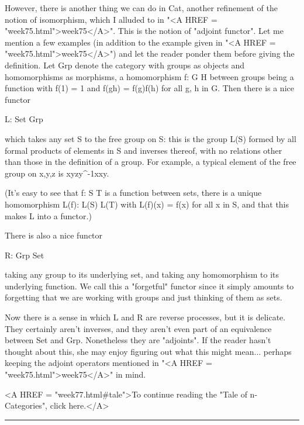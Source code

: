 However, there is another thing we can do in Cat, another refinement of
the notion of isomorphism, which I alluded to in "<A HREF =
"week75.html">week75</A>".  This is the notion of "adjoint
functor".  Let me mention a few examples (in addition to the
example given in "<A HREF = "week75.html">week75</A>") and let
the reader ponder them before giving the definition.  Let Grp denote the
category with groups as objects and homomorphisms as morphisms, a
homomorphism f: G \to  H between groups being a function with f(1) = 1
and f(gh) = f(g)f(h) for all g, h in G.  Then there is a nice functor

                        L: Set \to  Grp

which takes any set S to the free group on S: this is the group L(S) formed
by all formal products of elements in S and inverses thereof, with no
relations other than those in the definition of a group.  For
example, a typical element of the free group on {x,y,z} is
xyzy^{-1}xxy.  

(It's easy to see that f: S \to  T is a function between sets, there is a
unique homomorphism L(f): L(S) \to  L(T) with L(f)(x) = f(x) for all x in
S, and that this makes L into a functor.)

There is also a nice functor

                        R: Grp \to  Set

taking any group to its underlying set, and taking any homomorphism to
its underlying function.  We call this a "forgetful" functor since it
simply amounts to forgetting that we are working with groups and just
thinking of them as sets.  

Now there is a sense in which L and R are reverse processes, but it is
delicate.  They certainly aren't inverses, and they aren't even part of
an equivalence between Set and Grp.  Nonetheless they are "adjoints".
If the reader hasn't thought about this, she may enjoy figuring out what
this might mean... perhaps keeping the adjoint operators mentioned in
"<A HREF = "week75.html">week75</A>" in mind.

<A HREF = "week77.html#tale">To continue reading the "Tale of
n-Categories", click here.</A>


\par\noindent\rule{\textwidth}{0.4pt}


